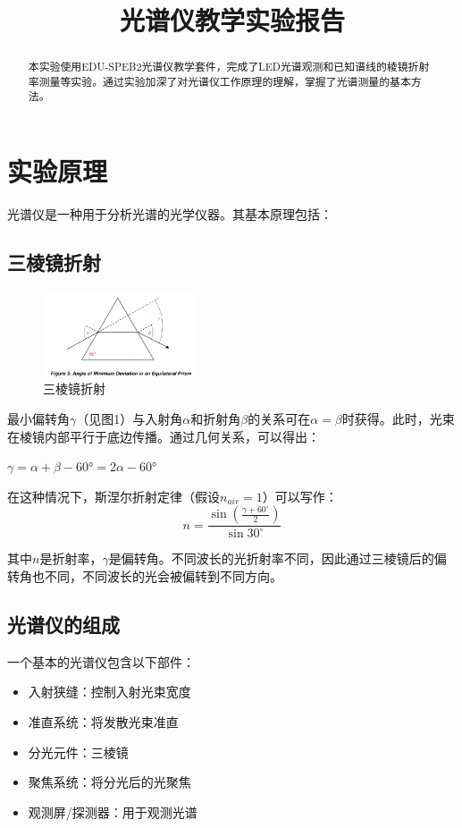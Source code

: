 \documentclass{ctexart}
\title{光谱仪教学实验报告}
\begin{document}
\maketitle

\begin{abstract}
本实验使用EDU-SPEB2光谱仪教学套件，完成了LED光谱观测和已知谱线的棱镜折射率测量等实验。通过实验加深了对光谱仪工作原理的理解，掌握了光谱测量的基本方法。
\end{abstract}

\section{实验原理}

光谱仪是一种用于分析光谱的光学仪器。其基本原理包括：

\subsection{三棱镜折射}
\begin{figure}[H]
    \centering
    \includegraphics[width=0.4\textwidth,height=0.2\textwidth]{pictures/三棱镜.png}
    \caption{三棱镜折射}
\end{figure}
最小偏转角$\gamma$（见图1）与入射角$\alpha$和折射角$\beta$的关系可在$\alpha = \beta$时获得。此时，光束在棱镜内部平行于底边传播。通过几何关系，可以得出：

$\gamma = \alpha + \beta - 60° = 2\alpha - 60°$

在这种情况下，斯涅尔折射定律（假设$n_{air} = 1$）可以写作：
\[n=\frac{\sin\left(\frac{\gamma+60^\circ}{2}\right)}{\sin 30^\circ}\]

其中$n$是折射率，$\gamma$是偏转角。不同波长的光折射率不同，因此通过三棱镜后的偏转角也不同，不同波长的光会被偏转到不同方向。
\subsection{光谱仪的组成}
一个基本的光谱仪包含以下部件：
\begin{itemize}
    \item 入射狭缝：控制入射光束宽度
    \item 准直系统：将发散光束准直
    \item 分光元件：三棱镜
    \item 聚焦系统：将分光后的光聚焦
    \item 观测屏/探测器：用于观测光谱
\end{itemize}
\end{document}
